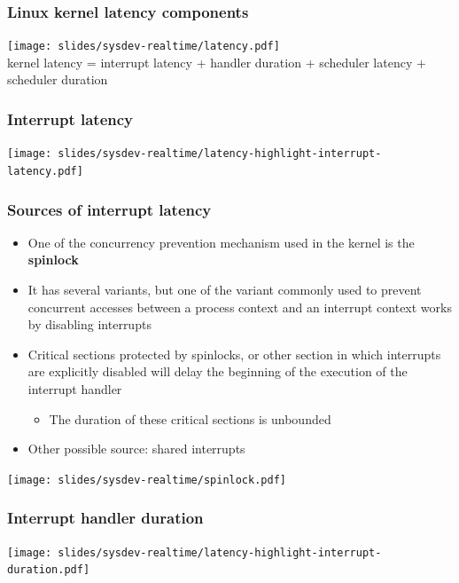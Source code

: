 \begin{frame}
  \frametitle{Linux kernel latency components}
  \begin{center}
    \texttt{[image: slides/sysdev-realtime/latency.pdf]}\\
    kernel latency = interrupt latency + handler duration + scheduler
    latency + scheduler duration
  \end{center}
\end{frame}

\begin{frame}
  \frametitle{Interrupt latency}
  \begin{center}
    \texttt{[image: slides/sysdev-realtime/latency-highlight-interrupt-latency.pdf]}
  \end{center}
\end{frame}

\begin{frame}
  \frametitle{Sources of interrupt latency}
  \begin{itemize}
  \item One of the concurrency prevention mechanism used in the kernel
    is the {\bf spinlock}
  \item It has several variants, but one of the variant commonly used
    to prevent concurrent accesses between a process context and an
    interrupt context works by disabling interrupts
  \item Critical sections protected by spinlocks, or other section in
    which interrupts are explicitly disabled will delay the beginning
    of the execution of the interrupt handler
    \begin{itemize}
    \item The duration of these critical sections is unbounded
    \end{itemize}
  \item Other possible source: shared interrupts
  \end{itemize}
  \begin{center}
    \texttt{[image: slides/sysdev-realtime/spinlock.pdf]}
  \end{center}
\end{frame}

\begin{frame}
\frametitle{Interrupt handler duration}
  \begin{center}
    \texttt{[image: slides/sysdev-realtime/latency-highlight-interrupt-duration.pdf]}
  \end{center}
\end{frame}


